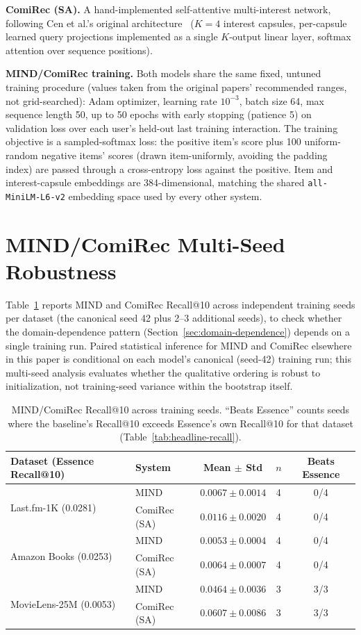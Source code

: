 \documentclass{article}
\begin{document}
\textbf{ComiRec (SA).} A hand-implemented self-attentive multi-interest network, following Cen et al.'s original architecture~\cite{cen2020} ($K=4$ interest capsules, per-capsule learned query projections implemented as a single $K$-output linear layer, softmax attention over sequence positions).

\textbf{MIND/ComiRec training.} Both models share the same fixed, untuned training procedure (values taken from the original papers' recommended ranges, not grid-searched): Adam optimizer, learning rate $10^{-3}$, batch size 64, max sequence length 50, up to 50 epochs with early stopping (patience 5) on validation loss over each user's held-out last training interaction. The training objective is a sampled-softmax loss: the positive item's score plus 100 uniform-random negative items' scores (drawn item-uniformly, avoiding the padding index) are passed through a cross-entropy loss against the positive. Item and interest-capsule embeddings are 384-dimensional, matching the shared \texttt{all-MiniLM-L6-v2} embedding space used by every other system.

\section{MIND/ComiRec Multi-Seed Robustness}
\label{app:multiseed}

Table~\ref{tab:multiseed} reports MIND and ComiRec Recall@10 across independent training seeds per dataset (the canonical seed 42 plus 2--3 additional seeds), to check whether the domain-dependence pattern (Section~\ref{sec:domain-dependence}) depends on a single training run. Paired statistical inference for MIND and ComiRec elsewhere in this paper is conditional on each model's canonical (seed-42) training run; this multi-seed analysis evaluates whether the qualitative ordering is robust to initialization, not training-seed variance within the bootstrap itself.

\begin{table}[H]
\centering
\caption{MIND/ComiRec Recall@10 across training seeds. ``Beats Essence'' counts seeds where the baseline's Recall@10 exceeds Essence's own Recall@10 for that dataset (Table~\ref{tab:headline-recall}).}
\label{tab:multiseed}
\small
\begin{tabular}{llccc}
\toprule
\textbf{Dataset (Essence Recall@10)} & \textbf{System} & \textbf{Mean $\pm$ Std} & $n$ & \textbf{Beats Essence} \\
\midrule
\multirow{2}{*}{Last.fm-1K (0.0281)} & MIND & $0.0067 \pm 0.0014$ & 4 & 0/4 \\
 & ComiRec (SA) & $0.0116 \pm 0.0020$ & 4 & 0/4 \\
\midrule
\multirow{2}{*}{Amazon Books (0.0253)} & MIND & $0.0053 \pm 0.0004$ & 4 & 0/4 \\
 & ComiRec (SA) & $0.0064 \pm 0.0007$ & 4 & 0/4 \\
\midrule
\multirow{2}{*}{MovieLens-25M (0.0053)} & MIND & $0.0464 \pm 0.0036$ & 3 & 3/3 \\
 & ComiRec (SA) & $0.0607 \pm 0.0086$ & 3 & 3/3 \\
\bottomrule
\end{tabular}
\end{table}
\end{document}
